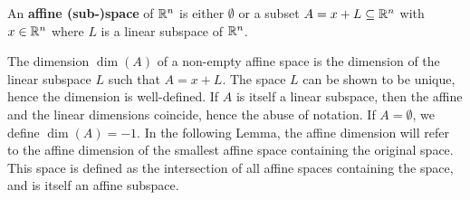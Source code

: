 \documentclass[../../main.tex]{subfiles}
\begin{document}
\begin{definition}
An \textbf{affine (sub-)space} of $\mathbb{R}^{n}$ is either $\emptyset$ or a subset $A=x+L\subseteq \mathbb{R}^{n}$ with $x\in \mathbb{R}^{n}$ where $L$ is a linear subspace of $\mathbb{R}^{n}$.

The dimension $\dim(A)$ of a non-empty affine space is the dimension of the linear subspace $L$ such that $A=x+L$. The space $L$ can be shown to be unique, hence the dimension is well-defined. If $A$ is itself a linear subspace, then the affine and the linear dimensions coincide, hence the abuse of notation. If $A=\emptyset$, we define $\dim(A)=-1$. In the following Lemma, the affine dimension will refer to the affine dimension of the smallest affine space containing the original space. This space is defined as the intersection of all affine spaces containing the space, and is itself an affine subspace.
\end{definition}
\end{document}
